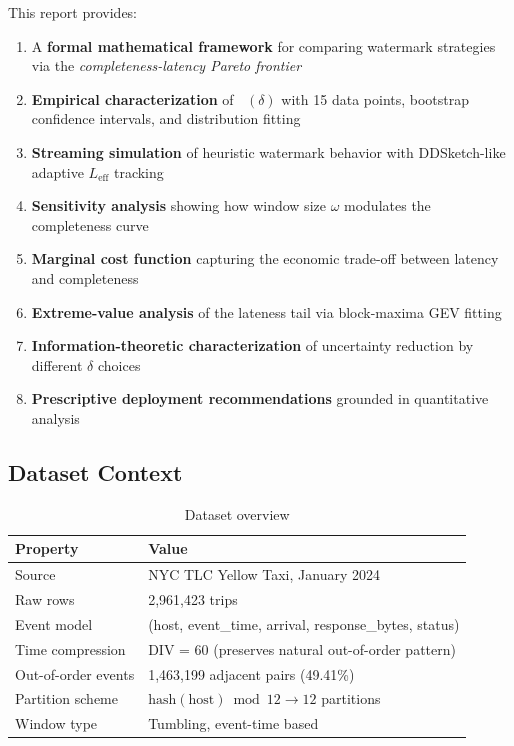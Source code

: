 \documentclass[11pt,a4paper]{article}
\DeclareMathOperator{\Cstrict}{C_{\text{strict}}}
\newcommand{\Leff}{L_{\text{eff}}}
\begin{document}
This report provides:
\begin{enumerate}[leftmargin=*, itemsep=1pt]
\item A \textbf{formal mathematical framework} for comparing watermark strategies via the \textit{completeness-latency Pareto frontier}
\item \textbf{Empirical characterization} of $\Cstrict(\delta)$ with 15 data points, bootstrap confidence intervals, and distribution fitting
\item \textbf{Streaming simulation} of heuristic watermark behavior with DDSketch-like adaptive $\Leff$ tracking
\item \textbf{Sensitivity analysis} showing how window size $\omega$ modulates the completeness curve
\item \textbf{Marginal cost function} capturing the economic trade-off between latency and completeness
\item \textbf{Extreme-value analysis} of the lateness tail via block-maxima GEV fitting
\item \textbf{Information-theoretic characterization} of uncertainty reduction by different $\delta$ choices
\item \textbf{Prescriptive deployment recommendations} grounded in quantitative analysis
\end{enumerate}

\subsection{Dataset Context}

\begin{table}[H]
\centering
\caption{Dataset overview}
\begin{tabular}{ll}
\toprule
\textbf{Property} & \textbf{Value} \\
\midrule
Source          & NYC TLC Yellow Taxi, January 2024 \\
Raw rows        & 2,961,423 trips \\
Event model     & (host, event\_time, arrival, response\_bytes, status) \\
Time compression & DIV = 60 (preserves natural out-of-order pattern) \\
Out-of-order events & 1,463,199 adjacent pairs (49.41\%) \\
Partition scheme & $\text{hash}(\text{host}) \bmod 12 \to 12$ partitions \\
Window type     & Tumbling, event-time based \\
\bottomrule
\end{tabular}
\end{table}
\end{document}
